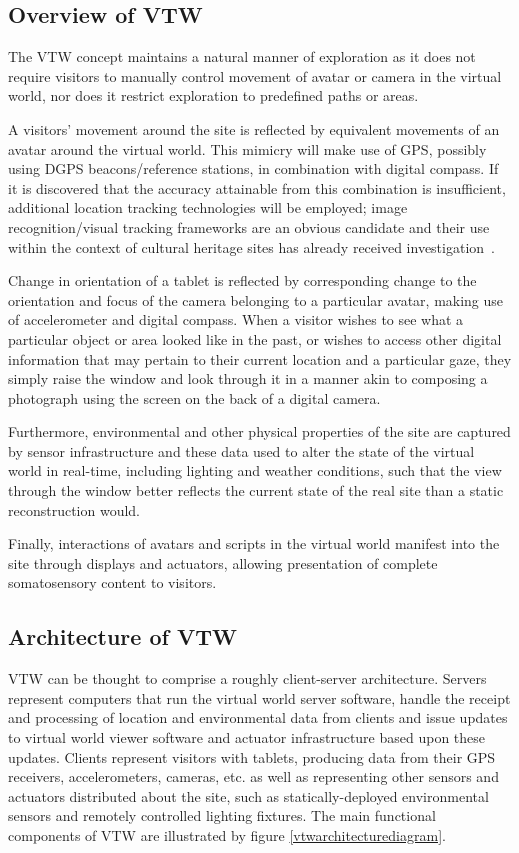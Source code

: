 \documentclass{sig-alternate}
\begin{document}
{\subsection{Overview of VTW}
\label{subsec:overviewofvtw}
The VTW concept maintains a natural manner of exploration as it does not require visitors to manually control movement of avatar or camera in the virtual world, nor does it restrict exploration to predefined paths or areas.

A visitors' movement around the site is reflected by equivalent movements of an avatar around the virtual world. This mimicry will make use of GPS, possibly using DGPS beacons/reference stations, in combination with digital compass. If it is discovered that the accuracy attainable from this combination is insufficient, additional location tracking technologies will be employed; image recognition/visual tracking frameworks are an obvious candidate and their use within the context of cultural heritage sites has already received investigation~\cite{Seo2010}.

Change in orientation of a tablet is reflected by corresponding change to the orientation and focus of the camera belonging to a particular avatar, making use of accelerometer and digital compass. When a visitor wishes to see what a particular object or area looked like in the past, or wishes to access other digital information that may pertain to their current location and a particular gaze, they simply raise the window and look through it in a manner akin to composing a photograph using the screen on the back of a digital camera.

Furthermore, environmental and other physical properties of the site are captured by sensor infrastructure and these data used to alter the state of the virtual world in real-time, including lighting and weather conditions, such that the view through the window better reflects the current state of the real site than a static reconstruction would.

Finally, interactions of avatars and scripts in the virtual world manifest into the site through displays and actuators, allowing presentation of complete somatosensory content to visitors.

\subsection{Architecture of VTW}
\label{subsec:architectureofvtw}
VTW can be thought to comprise a roughly client-server architecture. Servers represent computers that run the virtual world server software, handle the receipt and processing of location and environmental data from clients and issue updates to virtual world viewer software and actuator infrastructure based upon these updates. Clients represent visitors with tablets, producing data from their GPS receivers, accelerometers, cameras, etc. as well as representing other sensors and actuators distributed about the site, such as statically-deployed environmental sensors and remotely controlled lighting fixtures. The main functional components of VTW are illustrated by figure \ref{vtwarchitecturediagram}.

}
\end{document}
